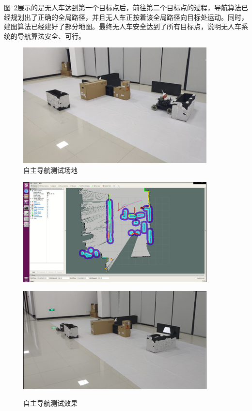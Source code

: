 图~\ref{fig:4-10}展示的是无人车达到第一个目标点后，前往第二个目标点的过程，导航算法已经规划出了正确的全局路径，并且无人车正按着该全局路径向目标处运动。同时，建图算法已经建好了部分地图。最终无人车安全达到了所有目标点，说明无人车系统的导航算法安全、可行。

\begin{figure}[htb]
	\centering
	\includegraphics[width=0.6\linewidth]{figures/4-9.png}
	\caption{自主导航测试场地}
	\label{fig:4-9}
\end{figure}

\clearpage
\begin{figure}[htb]
	\centering
	\begin{minipage}[t]{\linewidth} 
		\centering
		\includegraphics[width=0.6\columnwidth]{figures/4-10a.png} 
		\label{fig:4-10a}
	\end{minipage}
	\begin{minipage}[t]{\linewidth} 
		\centering
		\includegraphics[width=0.6\columnwidth]{figures/4-10b.png} 
		\label{fig:4-10b} 
	\end{minipage}
	\caption{自主导航测试效果}
	\label{fig:4-10}
\end{figure}

